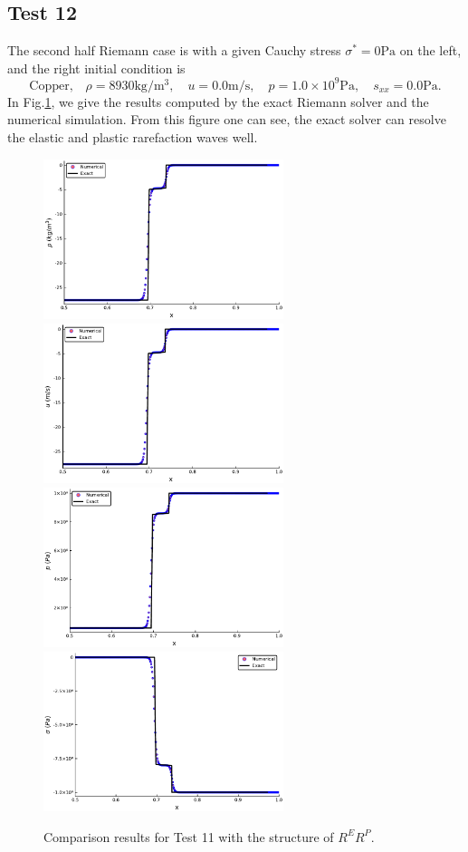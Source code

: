 \documentclass{article}
\numberwithin{equation}{section}
\numberwithin{table}{section}
\begin{document}
\subsection{Test 12}
The second half Riemann case is with a given Cauchy stress $\sigma^* = 0 \text{Pa}$ on the left, and the right initial condition is
\begin{equation}
  \text{Copper,}\quad\rho = 8930\text{kg}/\text{m}^3, \quad  u = 0.0\text{m}/\text{s}, \quad  p =1.0\times 10^9 \text{Pa}, \quad  s_{xx}=0.0\text{Pa}.
\end{equation}
In Fig.\ref{fig:case10}, we give the results computed by the exact Riemann solver and the numerical simulation. From this figure one can see, the exact solver can resolve the elastic and plastic rarefaction waves well.
\begin{figure}[ht]
  \centering
 \includegraphics[width= 7cm] {case11rho.pdf}
  \includegraphics[width= 7cm] {case11u.pdf}
  \includegraphics[width= 7cm] {case11p.pdf}
  \includegraphics[width= 7cm] {case11sigma.pdf}
    \caption{Comparison results for Test 11 with the structure of $R^ER^P$.  }
  \label{fig:case10}
\end{figure}
\end{document}

